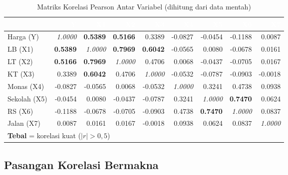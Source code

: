 \documentclass[12pt,a4paper]{article}
\begin{document}
\begin{table}[H]
\centering
\caption{Matriks Korelasi Pearson Antar Variabel (dihitung dari data mentah)}
\label{tab:corr_full}
\scriptsize
\setlength{\tabcolsep}{5pt}
\begin{tabular}{lrrrrrrrr}
\toprule
\rowcolor{headerblue}
\textcolor{white}{\textbf{}} &
\textcolor{white}{\textbf{Y}} &
\textcolor{white}{\textbf{X1}} &
\textcolor{white}{\textbf{X2}} &
\textcolor{white}{\textbf{X3}} &
\textcolor{white}{\textbf{X4}} &
\textcolor{white}{\textbf{X5}} &
\textcolor{white}{\textbf{X6}} &
\textcolor{white}{\textbf{X7}} \\
\midrule
\rowcolor{rowlight}
Harga (Y) & \textit{1.0000} & \textbf{0.5389} & \textbf{0.5166} & 0.3389 & -0.0827 & -0.0454 & -0.1188 & 0.0087 \\
LB (X1) & \textbf{0.5389} & \textit{1.0000} & \textbf{0.7969} & \textbf{0.6042} & -0.0565 & 0.0080 & -0.0678 & 0.0161 \\
\rowcolor{rowlight}
LT (X2) & \textbf{0.5166} & \textbf{0.7969} & \textit{1.0000} & 0.4706 & 0.0068 & -0.0437 & -0.0705 & 0.0167 \\
KT (X3) & 0.3389 & \textbf{0.6042} & 0.4706 & \textit{1.0000} & -0.0532 & -0.0787 & -0.0903 & -0.0018 \\
\rowcolor{rowlight}
Monas (X4) & -0.0827 & -0.0565 & 0.0068 & -0.0532 & \textit{1.0000} & 0.3241 & 0.4738 & 0.0938 \\
Sekolah (X5) & -0.0454 & 0.0080 & -0.0437 & -0.0787 & 0.3241 & \textit{1.0000} & \textbf{0.7470} & 0.0624 \\
\rowcolor{rowlight}
RS (X6) & -0.1188 & -0.0678 & -0.0705 & -0.0903 & 0.4738 & \textbf{0.7470} & \textit{1.0000} & 0.0837 \\
Jalan (X7) & 0.0087 & 0.0161 & 0.0167 & -0.0018 & 0.0938 & 0.0624 & 0.0837 & \textit{1.0000} \\
\bottomrule
\multicolumn{9}{l}{\footnotesize \textbf{Tebal} = korelasi kuat ($|r|>0{,}5$)}
\end{tabular}
\end{table}

\subsection{Pasangan Korelasi Bermakna}
\end{document}
